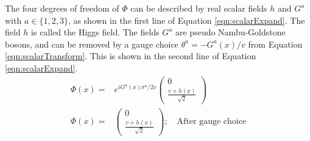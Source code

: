 The four degrees of freedom of $\Phi$ can be described by real scalar fields $h$ and $G^a$ with $a\in\{1,2,3\}$, as shown in the first line of Equation \ref{eqn:scalarExpand}.
The field $h$ is called the Higgs field.
The fields $G^a$ are pseudo Nambu-Goldstone bosons, and can be removed by a gauge choice $\theta^a=-G^a(x)/v$ from Equation \ref{eqn:scalarTransform}.
This is shown in the second line of Equation \ref{eqn:scalarExpand}.
\begin{equation}\begin{split}\label{eqn:scalarExpand}
\Phi(x)=&e^{iG^a(x)\sigma^a/2v}\begin{pmatrix}0\\\frac{v+h(x)}{\sqrt{2}}\end{pmatrix} \\
\Phi(x)=&\begin{pmatrix}0\\\frac{v+h(x)}{\sqrt{2}}\end{pmatrix}; \quad\text{After gauge choice} \\
\end{split}\end{equation}

